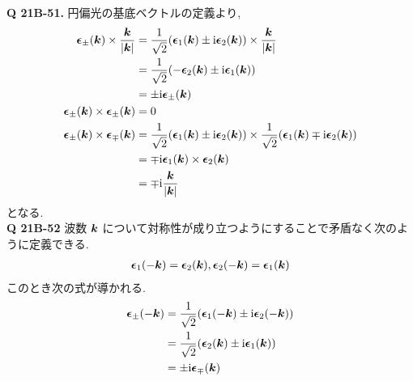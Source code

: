\documentclass[a4paper,dvipdfmx]{jsarticle}
\theoremstyle{definition}
\begin{document}
\textbf{Q 21B-51.}
円偏光の基底ベクトルの定義より,
\begin{align}
  \vb*{\epsilon}_\pm(\vb*{k})\times\frac{\vb*{k}}{|\vb*{k}|}
   & = \frac{1}{\sqrt{2}}\qty(\vb*{\epsilon}_1(\vb*{k}) \pm \mathrm{i}\vb*{\epsilon}_2(\vb*{k}))\times\frac{\vb*{k}}{|\vb*{k}|}                                    \\
   & = \frac{1}{\sqrt{2}}\qty(-\vb*{\epsilon}_2(\vb*{k}) \pm \mathrm{i}\vb*{\epsilon}_1(\vb*{k}))                                                          \\
   & = \pm\mathrm{i}\vb*{\epsilon}_\pm(\vb*{k})                                                                                             \\
  \vb*{\epsilon}_\pm(\vb*{k})\times\vb*{\epsilon}_\pm(\vb*{k})
   & = 0                                                                                                              \\
  \vb*{\epsilon}_\pm(\vb*{k})\times\vb*{\epsilon}_\mp(\vb*{k})
   & = \frac{1}{\sqrt{2}}\qty(\vb*{\epsilon}_1(\vb*{k}) \pm \mathrm{i}\vb*{\epsilon}_2(\vb*{k}))\times\frac{1}{\sqrt{2}}\qty(\vb*{\epsilon}_1(\vb*{k}) \mp \mathrm{i}\vb*{\epsilon}_2(\vb*{k})) \\
   & = \mp\mathrm{i}\vb*{\epsilon}_1(\vb*{k})\times\vb*{\epsilon}_2(\vb*{k})                                                                               \\
   & = \mp\mathrm{i}\frac{\vb*{k}}{|\vb*{k}|}
\end{align}
となる. \\

\textbf{Q 21B-52}
波数 $\vb*{k}$ について対称性が成り立つようにすることで矛盾なく次のように定義できる.
\begin{align}
  \vb*{\epsilon}_1(-\vb*{k}) = \vb*{\epsilon}_2(\vb*{k}), \vb*{\epsilon}_2(-\vb*{k}) = \vb*{\epsilon}_1(\vb*{k})
\end{align}
このとき次の式が導かれる.
\begin{align}
  \vb*{\epsilon}_\pm(-\vb*{k}) & = \frac{1}{\sqrt{2}}\qty(\vb*{\epsilon}_1(-\vb*{k})\pm\mathrm{i}\vb*{\epsilon}_2(-\vb*{k})) \\
                & = \frac{1}{\sqrt{2}}\qty(\vb*{\epsilon}_2(\vb*{k})\pm\mathrm{i}\vb*{\epsilon}_1(\vb*{k}))   \\
                & = \pm\mathrm{i}\vb*{\epsilon}_\mp(\vb*{k})
\end{align}
\end{document}
